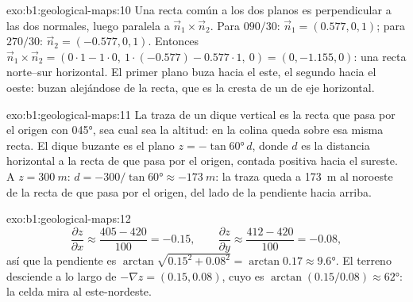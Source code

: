 \begin{solution}{exo:b1:geological-maps:10}
Una recta común a los dos planos es perpendicular a las dos normales, luego paralela a
$\vec n_1 \times \vec n_2$. Para $090/30$: $\vec n_1 = (0.577, 0,
1)$; para $270/30$: $\vec n_2 = (-0.577, 0, 1)$. Entonces $\vec n_1 \times \vec n_2
= (0\cdot 1 - 1\cdot 0,\ 1\cdot(-0.577) - 0.577\cdot 1,\ 0) = (0, -1.155,
0)$: una recta norte--sur horizontal. El primer plano buza hacia el este, el segundo hacia el oeste:
buzan alejándose de la recta, que es la cresta de un  de eje horizontal.
\end{solution}

\begin{solution}{exo:b1:geological-maps:11}
La traza de un dique vertical es la recta que pasa por el origen con  \ang{045}, sea cual sea
la altitud: en la colina queda sobre esa misma recta. El dique buzante es el plano $z = -\tan\ang{60}\,d$,
donde $d$ es la distancia horizontal a la recta de  que pasa por el origen, contada positiva
hacia el sureste. A $z = \qty{300}{m}$: $d = -300/\tan\ang{60}
\approx \qty{-173}{m}$: la traza queda a \qty{173}{m} al noroeste de la recta de  que pasa por
el origen, del lado de la pendiente hacia arriba.
\end{solution}

\begin{solution}{exo:b1:geological-maps:12}
\[
  \frac{\partial z}{\partial x} \approx \frac{405 - 420}{100} = -0.15, \qquad
  \frac{\partial z}{\partial y} \approx \frac{412 - 420}{100} = -0.08,
\]
así que la pendiente es $\arctan\sqrt{0.15^2 + 0.08^2} = \arctan 0.17 \approx
\ang{9.6}$. El terreno desciende a lo largo de $-\nabla z = (0.15, 0.08)$, cuyo  es
$\arctan(0.15/0.08) \approx \ang{62}$: la celda mira al este-nordeste.
\end{solution}

